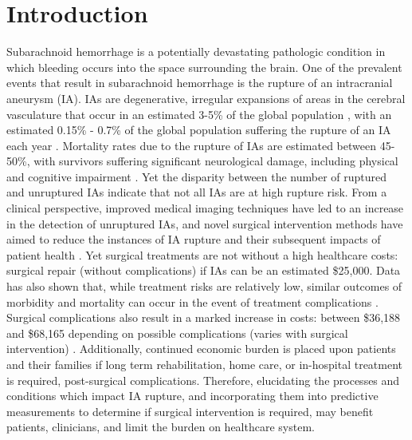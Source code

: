 \cleartooddpage[\thispagestyle{empty}]
\chapter{Introduction}\label{CHAPTER1}

Subarachnoid hemorrhage is a potentially devastating pathologic condition in which bleeding occurs into the space surrounding the brain. One of the prevalent events that result in subarachnoid hemorrhage is the rupture of an intracranial aneurysm (IA). IAs are degenerative, irregular expansions of areas in the cerebral vasculature that occur in an estimated 3-5\% of the global population \cite{revilla2018prevalence,hackenberg2018unruptured,villablanca2013natural}, with an estimated 0.15\% - 0.7\% of the global population suffering the rupture of an IA each year \cite{hughes2018estimating}. Mortality rates due to the rupture of IAs are estimated between 45-50\%, with survivors suffering significant neurological damage, including physical and cognitive impairment \cite{LONGO2017632,villablanca2013natural}. Yet the disparity between the number of ruptured and unruptured IAs indicate that not all IAs are at high rupture risk. 
	From a clinical perspective, improved medical imaging techniques have led to an increase in the detection of unruptured IAs, and novel surgical intervention methods have aimed to reduce the instances of IA rupture and their subsequent impacts of patient health \cite{molyneux2002international,komotar2008guidelines}. Yet surgical treatments are not without a high healthcare costs: surgical repair (without complications) if IAs can be an estimated \$25,000. Data has also shown that, while treatment risks are relatively low, similar outcomes of morbidity and mortality can occur in the event of treatment complications \cite{mascitelli2015predictors,liu2016recanalization,chalouhi2015safety}. Surgical complications also result in a marked increase in costs: between \$36,188 and \$68,165 depending on possible complications (varies with surgical intervention) \cite{brinjikji2012hospitalization}. Additionally, continued economic burden is placed upon patients and their families if long term rehabilitation, home care, or in-hospital treatment is required, post-surgical complications. Therefore, elucidating the processes and conditions which impact IA rupture, and incorporating them into predictive measurements to determine if surgical intervention is required, may benefit patients, clinicians, and limit the burden on healthcare system. 
	
